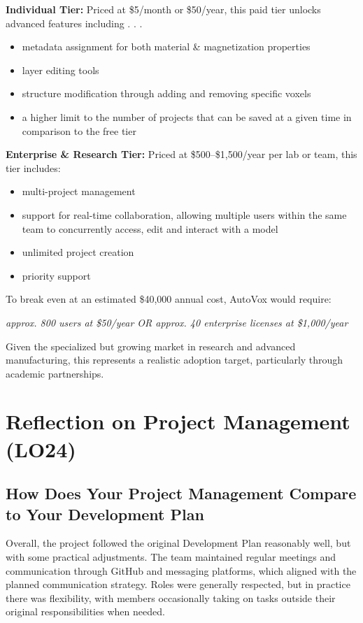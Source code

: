 \documentclass[12pt, titlepage]{article}
\begin{document}
\noindent \textbf{Individual Tier:} Priced at \$5/month or \$50/year, this paid tier unlocks advanced features including . . .
\begin{itemize}
    \item metadata assignment for both material \& magnetization properties
    \item layer editing tools
    \item structure modification through adding and removing specific voxels
    \item a higher limit to the number of projects that can be saved at a given time in comparison to the free tier
\end{itemize}

\noindent \textbf{Enterprise \& Research Tier:}
Priced at \$500–\$1,500/year per lab or team, this tier includes:
\begin{itemize}
    \item multi-project management
    \item support for real-time collaboration, allowing multiple users within the same team to concurrently access, edit and interact with a model
    \item unlimited project creation
    \item priority support
\end{itemize}

\noindent To break even at an estimated \$40,000 annual cost, AutoVox would require:
\begin{center}
    \textit{approx. 800 users at \$50/year \hspace{0.3cm} OR \hspace{0.3cm} approx. 40 enterprise licenses at \$1{,}000/year}
\end{center}

Given the specialized but growing market in research and advanced manufacturing, this represents a realistic adoption target, particularly through academic partnerships.

\section{Reflection on Project Management (LO24)}

\subsection{How Does Your Project Management Compare to Your Development Plan}

Overall, the project followed the original Development Plan reasonably well, but with some practical adjustments. The team maintained regular meetings and communication through GitHub and messaging platforms, which aligned with the planned communication strategy. Roles were generally respected, but in practice there was flexibility, with members occasionally taking on tasks outside their original responsibilities when needed.
\end{document}
